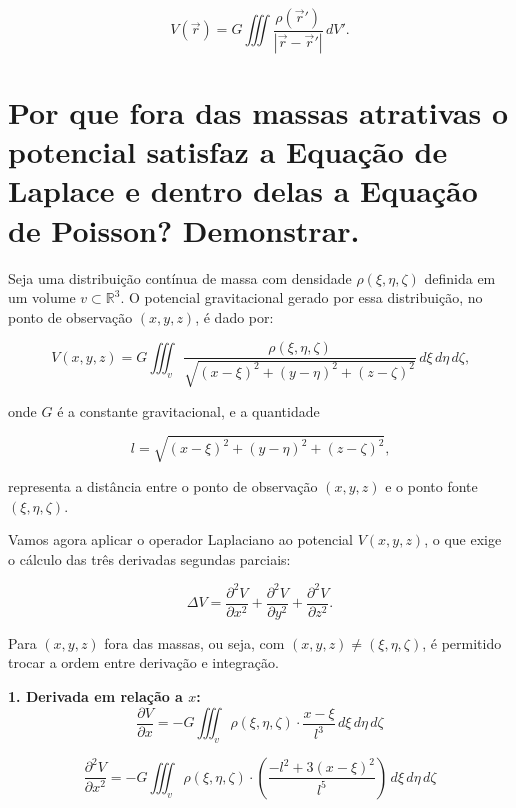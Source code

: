 \[
V(\vec{r}) = G \iiint \frac{\rho(\vec{r}')}{|\vec{r} - \vec{r}'|} \, dV' \text{.}
\]




\section{Por que fora das massas atrativas o potencial satisfaz a Equação de Laplace e dentro delas a Equação de Poisson? Demonstrar.}


Seja uma distribuição contínua de massa com densidade \( \rho(\xi, \eta, \zeta) \) definida em um volume \( v \subset \mathbb{R}^3 \). O potencial gravitacional gerado por essa distribuição, no ponto de observação \( (x, y, z) \), é dado por:

\[
V(x, y, z) = G \iiint_v \frac{\rho(\xi, \eta, \zeta)}{\sqrt{(x - \xi)^2 + (y - \eta)^2 + (z - \zeta)^2}} \, d\xi \, d\eta \, d\zeta \text{,}
\]

\noindent
onde \( G \) é a constante gravitacional, e a quantidade

\[
l = \sqrt{(x - \xi)^2 + (y - \eta)^2 + (z - \zeta)^2} \text{,}
\]

\noindent
representa a distância entre o ponto de observação \( (x, y, z) \) e o ponto fonte \( (\xi, \eta, \zeta) \).

Vamos agora aplicar o operador Laplaciano ao potencial \( V(x, y, z) \), o que exige o cálculo das três derivadas segundas parciais:

\[
\Delta V = 
\frac{\partial^2 V}{\partial x^2} +
\frac{\partial^2 V}{\partial y^2} +
\frac{\partial^2 V}{\partial z^2} \text{.}
\]



Para \( (x, y, z) \) fora das massas, ou seja, com \( (x, y, z) \ne (\xi, \eta, \zeta) \), é permitido trocar a ordem entre derivação e integração.



\textbf{1. Derivada em relação a \( x \):}
\[
\frac{\partial V}{\partial x}
= -G \iiint_v \rho(\xi, \eta, \zeta) \cdot \frac{x - \xi}{l^3} \, d\xi \, d\eta \, d\zeta
\]

\[
\frac{\partial^2 V}{\partial x^2}
= -G \iiint_v \rho(\xi, \eta, \zeta) \cdot \left( \frac{-l^2 + 3(x - \xi)^2}{l^5} \right) \, d\xi \, d\eta \, d\zeta
\]

